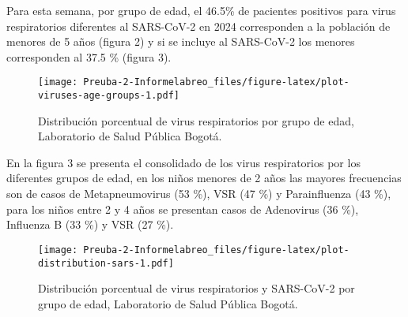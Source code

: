 \documentclass[
]{article}
\begin{document}
Para esta semana, por grupo de edad, el 46.5\% de pacientes positivos
para virus respiratorios diferentes al SARS-CoV-2 en 2024 corresponden a
la población de menores de 5 años (figura 2) y si se incluye al
SARS-CoV-2 los menores corresponden al 37.5 \% (figura 3).

\begin{figure}
\centering
\texttt{[image: Preuba-2-Informelabreo\_files/figure-latex/plot-viruses-age-groups-1.pdf]}
\caption{Distribución porcentual de virus respiratorios por grupo de
edad, Laboratorio de Salud Pública Bogotá.}
\end{figure}

En la figura 3 se presenta el consolidado de los virus respiratorios por
los diferentes grupos de edad, en los niños menores de 2 años las
mayores frecuencias son de casos de Metapneumovirus (53 \%), VSR (47 \%)
y Parainfluenza (43 \%), para los niños entre 2 y 4 años se presentan
casos de Adenovirus (36 \%), Influenza B (33 \%) y VSR (27 \%).

\begin{figure}
\centering
\texttt{[image: Preuba-2-Informelabreo\_files/figure-latex/plot-distribution-sars-1.pdf]}
\caption{Distribución porcentual de virus respiratorios y SARS-CoV-2 por
grupo de edad, Laboratorio de Salud Pública Bogotá.}
\end{figure}
\end{document}
